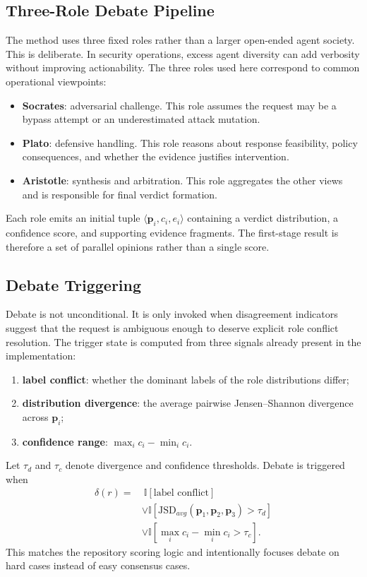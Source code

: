 \documentclass[pdflatex,sn-mathphys-num]{sn-jnl}
\begin{document}
\subsection{Three-Role Debate Pipeline}

The method uses three fixed roles rather than a larger open-ended agent society. This is deliberate. In security operations, excess agent diversity can add verbosity without improving actionability. The three roles used here correspond to common operational viewpoints:
\begin{itemize}
  \item \textbf{Socrates}: adversarial challenge. This role assumes the request may be a bypass attempt or an underestimated attack mutation.
  \item \textbf{Plato}: defensive handling. This role reasons about response feasibility, policy consequences, and whether the evidence justifies intervention.
  \item \textbf{Aristotle}: synthesis and arbitration. This role aggregates the other views and is responsible for final verdict formation.
\end{itemize}

Each role emits an initial tuple $\langle \mathbf{p}_i, c_i, e_i \rangle$ containing a verdict distribution, a confidence score, and supporting evidence fragments. The first-stage result is therefore a set of parallel opinions rather than a single score.

\subsection{Debate Triggering}

Debate is not unconditional. It is only invoked when disagreement indicators suggest that the request is ambiguous enough to deserve explicit role conflict resolution. The trigger state is computed from three signals already present in the implementation:
\begin{enumerate}
  \item \textbf{label conflict}: whether the dominant labels of the role distributions differ;
  \item \textbf{distribution divergence}: the average pairwise Jensen--Shannon divergence across $\mathbf{p}_i$;
  \item \textbf{confidence range}: $\max_i c_i - \min_i c_i$.
\end{enumerate}

Let $\tau_d$ and $\tau_c$ denote divergence and confidence thresholds. Debate is triggered when
\begin{equation}
\begin{aligned}
\delta(r) = &\ \mathbb{I}[\text{label conflict}] \\
& \lor \mathbb{I}[\mathrm{JSD}_{avg}(\mathbf{p}_1,\mathbf{p}_2,\mathbf{p}_3) > \tau_d] \\
& \lor \mathbb{I}[\max_i c_i - \min_i c_i > \tau_c].
\end{aligned}
\end{equation}
This matches the repository scoring logic and intentionally focuses debate on hard cases instead of easy consensus cases.
\end{document}
